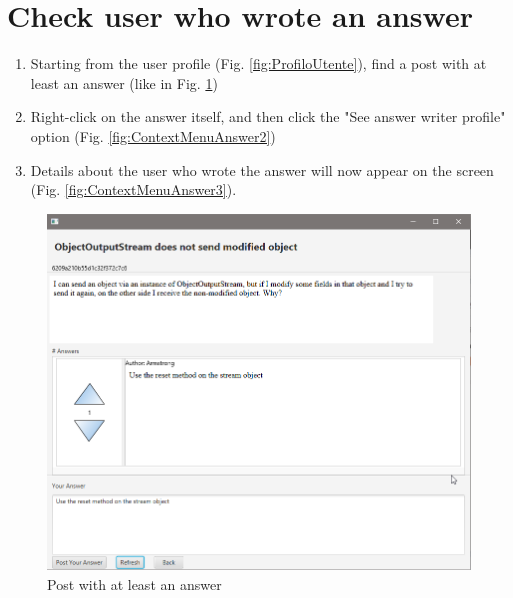 \documentclass[11pt]{report}
\begin{document}
\section{Check user who wrote an answer}
\begin{enumerate}
    \item Starting from the user profile (Fig. \ref{fig:ProfiloUtente}), find a post with at least an answer (like in Fig. \ref{fig:ContextMenuAnswer1})
    \item Right-click on the answer itself, and then click the "See answer writer profile" option (Fig. \ref{fig:ContextMenuAnswer2})
    \item Details about the user who wrote the answer will now appear on the screen (Fig. \ref{fig:ContextMenuAnswer3}).
\end{enumerate}
\begin{figure}[H]
  \centering
  \includegraphics[width=\textwidth,keepaspectratio=true]{img/user_manual/ContextMenuAnswer1.png}
  \caption{Post with at least an answer}
  \label{fig:ContextMenuAnswer1}
\end{figure}
\end{document}
